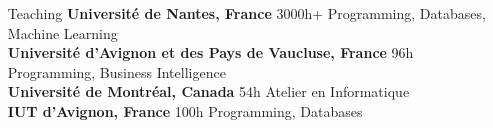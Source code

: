 \documentclass[11pt,a4paper]{article}
\begin{document}
\begin{itemize}
\begin{itemize}[
font=\normalfont\bfseries,
itemsep=.1cm,
wide=0cm,
labelsep*=.1cm]
\item[Journal Reviewing]~\\[.2em]
    Traitement Automatique des Langues, 
    Information Retrieval, 
    Natural Language Engineering, 
    Information Processing \& Management,
    Language Resources and Evaluation,
    BMC Bioinformatics
    
\end{itemize}


\item[Teaching]
\textbf{Université de Nantes, France} \hfill 3000h+ \newline
Programming, Databases, Machine Learning \\[-.5cm]
                    
\textbf{Université d'Avignon et des Pays de Vaucluse, France} \hfill 96h \newline
Programming, Business Intelligence \\[-.5cm]
                    
\textbf{Université de Montréal, Canada} \hfill 54h \newline
Atelier en Informatique \\[-.5cm]
                
\textbf{IUT d'Avignon, France} \hfill 100h \newline
Programming, Databases \\[-.5cm]

\end{itemize}
\end{document}
